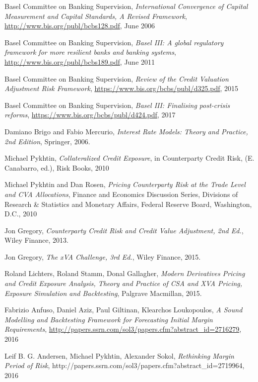 \documentclass[12pt, a4paper]{article}
\begin{document}
{\begin{thebibliography}{*}
 Basel Committee on Banking Supervision, {\em International Convergence of Capital Measurement and
    Capital Standards, A Revised Framework}, \url{http://www.bis.org/publ/bcbs128.pdf}, June 2006

 Basel Committee on Banking Supervision, {\em Basel III: A global regulatory framework for more
    resilient banks and banking systems}, \url{http://www.bis.org/publ/bcbs189.pdf}, June 2011

 Basel Committee on Banking Supervision, {\em Review of the Credit Valuation Adjustment Risk Framework}, \url{https://www.bis.org/bcbs/publ/d325.pdf}, 2015

 Basel Committee on Banking Supervision, {\em Basel III: Finalising post-crisis reforms}, \url{https://www.bis.org/bcbs/publ/d424.pdf}, 2017

 Damiano Brigo and Fabio Mercurio, {\em Interest Rate Models: Theory and Practice, 2nd Edition},
  Springer, 2006.

 Michael Pykhtin, {\em Collateralized Credit Exposure}, in Counterparty Credit Risk, (E. Canabarro,
  ed.), Risk Books, 2010

 Michael Pykhtin and Dan Rosen, {\em Pricing Counterparty Risk at the Trade Level and CVA
    Allocations}, Finance and Economics Discussion Series, Divisions of Research \& Statistics and Monetary Affairs,
  Federal Reserve Board, Washington, D.C., 2010

 Jon Gregory, {\em Counterparty Credit Risk and Credit Value Adjustment, 2nd Ed.}, Wiley Finance,
  2013.

 Jon Gregory, {\em The xVA Challenge, 3rd Ed.}, Wiley Finance, 2015.

 Roland Lichters, Roland Stamm, Donal Gallagher, {\em Modern Derivatives Pricing and Credit Exposure
    Analysis, Theory and Practice of CSA and XVA Pricing, Exposure Simulation and Backtesting}, Palgrave Macmillan,
  2015.

 Fabrizio Anfuso, Daniel Aziz, Paul Giltinan, Klearchos Loukopoulos, {\em A Sound Modelling and
    Backtesting Framework for Forecasting Initial Margin Requirements},
  \url{http://papers.ssrn.com/sol3/papers.cfm?abstract_id=2716279}, 2016

 Leif B. G. Andersen, Michael Pykhtin, Alexander Sokol, {\em Rethinking Margin Period of Risk},
  http://papers.ssrn.com/sol3/papers.cfm?abstract\_id=2719964, 2016


\end{thebibliography}}
\end{document}
